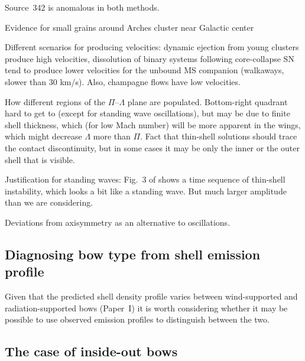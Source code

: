 \message{ !name(bs-bw-dw-03.tex)}\documentclass[useAMS, usenatbib, a4paper]{mnras}
\begin{document}
Source~342 is anomalous in both methods.

Evidence for small grains around Arches cluster near Galactic center \citep{Hankins:2017a}



Different scenarios for producing velocities: dynamic ejection from
young clusters \citep{Hoogerwerf:2001a, Oh:2016c} produce high
velocities, dissolution of binary systems following core-collapse SN
\citep{Renzo:2018a} tend to produce lower velocities for the unbound
MS companion (walkaways, slower than 30 km/s).  Also, champagne flows
have low velocities.

How different regions of the \(\Pi\)--\(\Lambda\) plane are populated.
Bottom-right quadrant hard to get to (except for standing wave
oscillations), but may be due to finite shell thickness, which (for
low Mach number) will be more apparent in the wings, which might
decrease \(\Lambda\) more than \(\Pi\).  Fact that thin-shell solutions should
trace the contact discontinuity, but in some cases it may be only the
inner or the outer shell that is visible.

Justification for standing waves: Fig.~3 of \citet{Meyer:2016a} shows
a time sequence of thin-shell instability, which looks a bit like a
standing wave. But much larger amplitude than we are considering.

Deviations from axisymmetry as an alternative to oscillations. 

\subsection{Diagnosing bow type from shell emission profile}
\label{sec:diagnosing-bow-type}

Given that the predicted shell density profile varies between
wind-supported and radiation-supported bows (Paper~I) it is worth
considering whether it may be possible to use observed emission
profiles to distinguish between the two.



\subsection{The case of inside-out bows}
\label{sec:case-inside-out}
\end{document}
